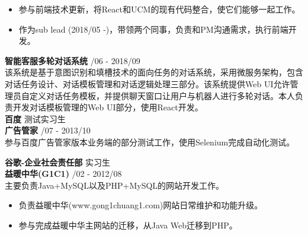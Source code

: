 \documentclass[a4paper]{article}
\newenvironment{changemargin}[2]{%
  \begin{list}{}{%
    \setlength{\topsep}{0pt}%
    \setlength{\leftmargin}{#1}%
    \setlength{\rightmargin}{#2}%
    \setlength{\listparindent}{\parindent}%
    \setlength{\itemindent}{\parindent}%
    \setlength{\parsep}{\parskip}%
  }%
  \item[]}{\end{list}
}
\newenvironment{body} {
	\vspace*{-16pt}
	\begin{changemargin}{-0.5in}{-0.5in}
  }	
	{\end{changemargin}
}
\begin{document}
\begin{body}
\begin{itemize}
	\end{itemize}
	\vspace*{-12pt}
	\begin{itemize} \itemsep -0pt  %
		\item 参与前端技术更新，将{\fontarial React}和{\fontarial UCM}的现有代码整合，使它们能够一起工作。\\
	\end{itemize}
	\vspace*{-12pt}
	\begin{itemize} \itemsep -0pt  %
		\item 作为{\fontarial sub lead (2018/05 -)}，带领两个同事，负责和{\fontarial PM}沟通需求，执行前端开发。\\
	\end{itemize}
	\vspace*{-2pt}
	\textbf{智能客服多轮对话系统} \hfill {/06 - 2018/09}\\ 
	该系统是基于意图识别和填槽技术的面向任务的对话系统，采用微服务架构，包含对话任务设计、对话模板管理和对话逻辑处理三部分。该系统提供{\fontarial Web UI}允许管理员自定义对话任务模板，并提供聊天窗口让用户与机器人进行多轮对话。本人负责开发对话模板管理的{\fontarial Web UI}部分，使用{\fontarial React}开发。\\
	\vspace{10pt}
	\textbf{百度} \hfill 测试实习生\\ 
	\textbf{广告管家} \hfill {/07 - 2013/10}\\ 
	参与百度广告管家{}版本业务端的部分测试工作，使用{\fontarial Selenium}完成自动化测试。

	\vspace{10pt}
	\textbf{谷歌-企业社会责任部} \hfill 实习生\\ 
	\textbf{益暖中华{\fontarial (G1C1)}} \hfill {/02 - 2012/08}\\ 
	主要负责{\fontarial Java+MySQL}以及{\fontarial PHP+MySQL}的网站开发工作。\\ 
	\vspace*{-6pt}
	\begin{itemize} \itemsep -0pt  %
		\item 负责益暖中华{\fontarial(www.gong1chuang1.com)}网站日常维护和功能升级。\\
	\end{itemize}
	\vspace*{-12pt}
	\begin{itemize} \itemsep -0pt  %
		\item 参与完成益暖中华主网站的迁移，从{\fontarial Java Web}迁移到{\fontarial PHP}。\\
	\end{itemize}
\end{body}
\end{document}
